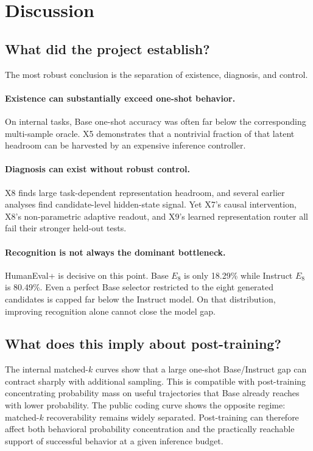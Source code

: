 \documentclass[11pt]{article}
\begin{document}
\section{Discussion}

\subsection{What did the project establish?}

The most robust conclusion is the separation of existence, diagnosis, and control.

\paragraph{Existence can substantially exceed one-shot behavior.}
On internal tasks, Base one-shot accuracy was often far below the corresponding multi-sample oracle. X5 demonstrates that a nontrivial fraction of that latent headroom can be harvested by an expensive inference controller.

\paragraph{Diagnosis can exist without robust control.}
X8 finds large task-dependent representation headroom, and several earlier analyses find candidate-level hidden-state signal. Yet X7's causal intervention, X8's non-parametric adaptive readout, and X9's learned representation router all fail their stronger held-out tests.

\paragraph{Recognition is not always the dominant bottleneck.}
HumanEval+ is decisive on this point. Base $E_8$ is only 18.29\% while Instruct $E_8$ is 80.49\%. Even a perfect Base selector restricted to the eight generated candidates is capped far below the Instruct model. On that distribution, improving recognition alone cannot close the model gap.

\subsection{What does this imply about post-training?}

The internal matched-$k$ curves show that a large one-shot Base/Instruct gap can contract sharply with additional sampling. This is compatible with post-training concentrating probability mass on useful trajectories that Base already reaches with lower probability. The public coding curve shows the opposite regime: matched-$k$ recoverability remains widely separated. Post-training can therefore affect both behavioral probability concentration and the practically reachable support of successful behavior at a given inference budget.
\end{document}
